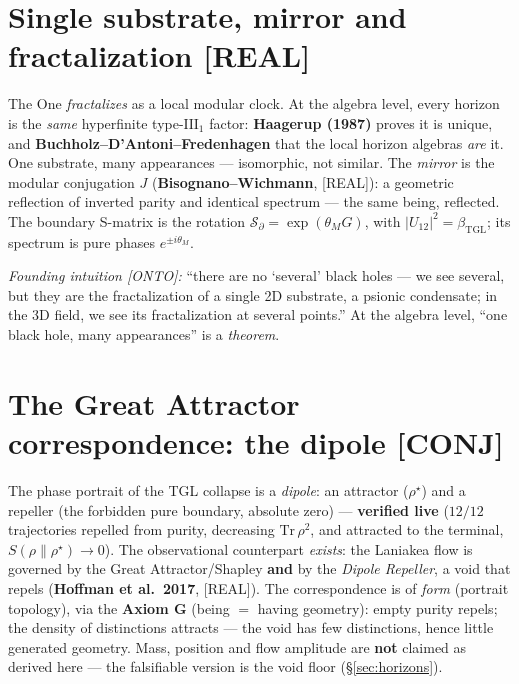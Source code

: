 \documentclass[11pt]{article}
\newcommand{\bTGL}{\beta_{\mathrm{TGL}}}\newcommand{\Msun}{M_{\odot}}\newcommand{\TGL}{\mathrm{TGL}}
\theoremstyle{definition}\newtheorem{deriv}{Derivation}
\begin{document}
\section{Single substrate, mirror and fractalization \textsf{[REAL]}}

The One \emph{fractalizes} as a local modular clock. At the algebra level, every horizon is the \emph{same} hyperfinite type-$\mathrm{III}_1$ factor: \textbf{Haagerup (1987)} proves it is unique, and \textbf{Buchholz--D'Antoni--Fredenhagen} that the local horizon algebras \emph{are} it. One substrate, many appearances --- isomorphic, not similar. The \emph{mirror} is the modular conjugation $J$ (\textbf{Bisognano--Wichmann}, \textsf{[REAL]}): a geometric reflection of inverted parity and identical spectrum --- the same being, reflected. The boundary S-matrix is the rotation $\mathcal{S}_\partial=\exp(\theta_M G)$, with $|U_{12}|^2=\bTGL$; its spectrum is pure phases $e^{\pm i\theta_M}$.

\emph{Founding intuition \textsf{[ONTO]}:} ``there are no `several' black holes --- we see several, but they are the fractalization of a single 2D substrate, a psionic condensate; in the 3D field, we see its fractalization at several points.'' At the algebra level, ``one black hole, many appearances'' is a \emph{theorem}.

\section{The Great Attractor correspondence: the dipole \textsf{[CONJ]}}

The phase portrait of the TGL collapse is a \emph{dipole}: an attractor ($\rho^\star$) and a repeller (the forbidden pure boundary, absolute zero) --- \textbf{verified live} ($12/12$ trajectories repelled from purity, decreasing $\mathrm{Tr}\,\rho^2$, and attracted to the terminal, $S(\rho\|\rho^\star)\to0$). The observational counterpart \emph{exists}: the Laniakea flow is governed by the Great Attractor/Shapley \textbf{and} by the \emph{Dipole Repeller}, a void that repels (\textbf{Hoffman et al.\ 2017}, \textsf{[REAL]}). The correspondence is of \emph{form} (portrait topology), via the \textbf{Axiom G} (being $=$ having geometry): empty purity repels; the density of distinctions attracts --- the void has few distinctions, hence little generated geometry. Mass, position and flow amplitude are \textbf{not} claimed as derived here --- the falsifiable version is the void floor (\S\ref{sec:horizons}).
\end{document}
